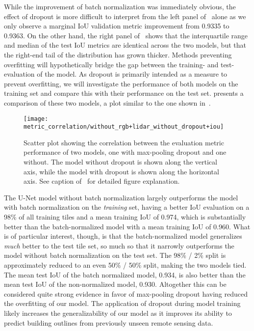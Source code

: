 While the improvement of batch normalization was immediately obvious, the effect of dropout is more difficult to interpret from the left panel of~ alone as we only observe a marginal IoU validation metric improvement from \num{0.9335} to \num{0.9363}.
On the other hand, the right panel of~ shows that the interquartile range and median of the test IoU metrics are identical across the two models, but that the right-end tail of the distribution has grown thicker.
Methods preventing overfitting will hypothetically bridge the gap between the training- and test-evaluation of the model.
As dropout is primarily intended as a measure to prevent overfitting, we will investigate the performance of both models on the training set and compare this with their performance on the test set.
 presents a comparison of these two models, a plot similar to the one shown in~.
\vspace{-\baselineskip}
\begin{figure}[H]
  \centering
  \texttt{[image: metric\_correlation/without\_rgb+lidar\_without\_dropout+iou]}
  \vspace{-\baselineskip}
  \caption{%
    Scatter plot showing the correlation between the evaluation metric performance of two models, one with max-pooling dropout and one without.
    The model without dropout is shown along the vertical axis, while the model with dropout is shown along the horizontal axis.
    See caption of~ for detailed figure explanation.
  }%
  \label{fig:dropout-train-test}
\end{figure}

The U-Net model without batch normalization largely outperforms the model with batch normalization on the \emph{training} set, having a better IoU evaluation on a 98\% of all training tiles and a mean training IoU of \num{0.974}, which is substantially better than the batch-normalized model with a mean training IoU of \num{0.960}.
What is of particular interest, though, is that the batch-normalized model generalizes \emph{much} better to the test tile set, so much so that it narrowly outperforms the model without batch normalization on the test set.
The 98\% / 2\% split is approximately reduced to an even 50\% / 50\% split, making the two models tied.
The mean test IoU of the batch normalized model, \num{0.934}, is also better than the mean test IoU of the non-normalized model, \num{0.930}.
Altogether this can be considered quite strong evidence in favor of max-pooling dropout having reduced the overfitting of our model.
The application of dropout during model training likely increases the generalizability of our model as it improves its ability to predict building outlines from previously unseen remote sensing data.

